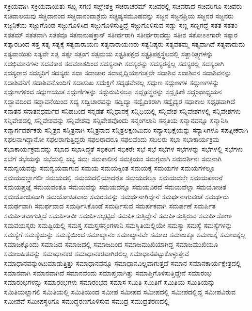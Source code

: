 {ಸಕ್ರಿಯವಾಗಿ
ಸಕ್ರಿಯವಾಯಿತು
ಸಖ್ಯ
ಸಗಣಿ
ಸಙ್ಘೇಶಕ್ತಿ
ಸಚರಾಚರಮ್
ಸಚಿವರಲ್ಲಿ
ಸಚಿವರಾದ
ಸಚಿವರಿಗೂ
ಸಚಿವರು
ಸಚಿವಾಲಯವು
ಸಚ್ಚಿದಾನಂದ
ಸಚ್ಚಿದಾನಂದಾಶ್ರಮ
ಸಚ್ಛಿಷ್ಯಸಮೂಹವನ್ನು
ಸಜ್ಜನ
ಸಜ್ಜನಪ್ರಿಯ
ಸಜ್ಜನರ
ಸಜ್ಜನರು
ಸಜ್ಜನಿಕೆಯ
ಸಜ್ಜುಗೊಂಡ
ಸಜ್ಜುಗೊಳಿಸಿದ
ಸಜ್ಜುಗೊಳಿಸುತ್ತಿದ್ದೆ
ಸಜ್ಜುಗೊಳಿಸುವ
ಸಡ್ಡು
ಸಣ್ಣ
ಸಣ್ಣಗದ್ದೆ
ಸತತ
ಸತತಂ
ಸತತಮ್
ಸತತವಾಗಿ
ಸತತವೂ
ಸತನಾನುಷಕ್ತಾನ್
ಸತೀರ್ಥರಾಗಿ
ಸತೀರ್ಥರಾದದ್ದು
ಸತೀಶ
ಸತೋಽಽಗಾರೇ
ಸತ್ಕಾರ
ಸತ್ಕಾರದಿಂದ
ಸತ್ತ
ಸತ್ಯ
ಸತ್ಯಕ್ಕೆ
ಸತ್ಯನಾರಾಯಣ
ಸತ್ಯನಾರಾಯಣರು
ಸತ್ಯನಿಷ್ಠರು
ಸತ್ಯವತಮ್ಮ
ಸತ್ಯವಾಗಿದೆ
ಸತ್ಯವಾದುದು
ಸತ್ಯವಾಯಿತು
ಸತ್ಯವೇ
ಸತ್ವ
ಸತ್ವೇ
ಸತ್ಸಂಗ
ಸತ್ಸಮಯ
ಸತ್ಪ್ರತಿಪಕ್ಷದ
ಸತ್ಪ್ರತಿಪಕ್ಷಸ್ಥಲದಲ್ಲಿ
ಸತ್ಚಾರಿತ್ರ್ಯಗಳನ್ನು
ಸದಭಿಮಾನಗಳು
ಸದವಕಾಶ
ಸದವಕಾಶದಿಂದ
ಸದಸ್ಯನಾಗಿ
ಸದಸ್ಯರನ್ನು
ಸದಸ್ಯರನ್ನೆಲ್ಲ
ಸದಸ್ಯರಲ್ಲಿ
ಸದಸ್ಯರಾಗಿ
ಸದಸ್ಯರಾದ
ಸದಸ್ಯರಿಗೆ
ಸದಸ್ಯರು
ಸದಾ
ಸದಾಚಾರ
ಸದಾವೃದ್ದಿಯಾಗುತ್ತಲೇ
ಸದಾಶಿವ
ಸದಾಶಿವನ
ಸದಾಶಿವನನ್ನು
ಸದಾಶಿವನಿಗೆ
ಸದಾಶಿವನೊಂದಿಗೆ
ಸದಾಸುಖ
ಸದುಕ್ತಿಗೆ
ಸದೃಢವೇನಲ್ಲ
ಸದ್ಗುಣ
ಸದ್ಗುಣಗಳ
ಸದ್ಗುಣಗಳನ್ನು
ಸದ್ಗುಣಗಳಿಂದ
ಸದ್ಗುಣಯುತ
ಸದ್ಗುಣಿಗಳನ್ನು
ಸದ್ಗುರುವಿನಲ್ಲೂ
ಸದ್ಗೃಹಸ್ಥರನ್ನು
ಸದ್ಗೃಹಿಣಿ
ಸದ್ಗ್ರಂಥಾಧ್ಯಯನ
ಸದ್ಭಾವದಿಂದ
ಸದ್ಭಾವನೆಯಿಂದ
ಸದ್ಯ
ಸದ್ವಿಚಾರವನ್ನು
ಸದ್ವಿದ್ಯಾ
ಸದ್ವೈದಿಕರಾಗಿ
ಸದ್ವೈದ್ಯರ
ಸಧಾಕಾಲ
ಸಧೃಢವಾಗಿದೆ
ಸನಾತನ
ಸನಾತನಧರ್ಮದ
ಸನಿಹದಿಂದ
ಸನ್ನಡತೆ
ಸನ್ನಿಧಾನಕ್ಕೆ
ಸನ್ನಿಧಿಯಲ್ಲಿ
ಸನ್ನಿವೇಶ
ಸನ್ನಿವೇಶಗಳಲ್ಲಿ
ಸನ್ನಿವೇಶಗಳು
ಸನ್ನಿವೇಶದಲ್ಲಿ
ಸನ್ನಿವೇಶವನ್ನು
ಸನ್ನಿವೇಶವು
ಸನ್ನಿವೇಶವೊಂದು
ಸನ್ಮಂಗಲಾನಿ
ಸನ್ಮತಿಯ
ಸನ್ಮಾನವನ್ನೂ
ಸನ್ಮಾನಿಸಿ
ಸನ್ಮಾರ್ಗದರ್ಶಕರು
ಸನ್ಮಿತ್ರನ
ಸನ್ಮಿತ್ರನಾಗಿ
ಸನ್ಮಿತ್ರನಾದ
ಸನ್ಮಿತ್ರಲಕ್ಷಣಮಿದಂ
ಸನ್ಯಾಸಭಿಕ್ಷೆಯನ್ನು
ಸನ್ಯಾಸಿಗಳೂ
ಸಪತ್ನೀಕರಾಗಿ
ಸಫಲನಾಗಿದ್ದಾನೋ
ಸಫಲರಾಗುತ್ತಿದ್ದರು
ಸಫಲರಾದರೂ
ಸಫಲವೆಂದು
ಸಬಲರು
ಸಭಾ
ಸಭಾಕಾರ್ಯಕ್ರಮ
ಸಭಾಕಾರ್ಯಕ್ರಮವನ್ನು
ಸಭಾದ
ಸಭಾಸಿದ್ಧತೆ
ಸಭಿಕರಿಗೆ
ಸಭಿಕರೇ
ಸಭೆ
ಸಭೆ
ಸಭೆಗಳ
ಸಭೆಗಳನ್ನು
ಸಭೆಗಳಲ್ಲಿ
ಸಭೆಗಳು
ಸಭೆಗೆ
ಸಭೆಯನ್ನು
ಸಭೆಯಲ್ಲಿ
ಸಭ್ಯ
ಸಮಃ
ಸಮಕಾಲೀನ
ಸಮಕ್ರಿಯಂ
ಸಮಗ್ರವಾಗಿ
ಸಮದರ್ಶಿನಃ
ಸಮನಾಗಿ
ಸಮನ್ವಯವನ್ನು
ಸಮನ್ವಯವಾಗುವ
ಸಮಯ
ಸಮಯಕ್ಕಿಂತ
ಸಮಯಕ್ಕೆ
ಸಮಯಗಳ
ಸಮಯಗಳಲ್ಲೂ
ಸಮಯದಲ್ಲಾಗಲೀ
ಸಮಯದಲ್ಲಿ
ಸಮಯದಲ್ಲಿಯಾದರೂ
ಸಮಯದಲ್ಲೂ
ಸಮಯದಲ್ಲೇ
ಸಮಯಪಾಲನೆ
ಸಮಯಪ್ರಜ್ಞೆ
ಸಮಯವಂತೂ
ಸಮಯವನ್ನು
ಸಮಯವನ್ನೂ
ಸಮಯವಿರದೆ
ಸಮಯವೆಲ್ಲಾ
ಸಮಯೋಚಿತ
ಸಮಯೋಚಿತವಾಗಿ
ಸಮಯೋಚಿತವಾದ
ಸಮರಸವನ್ನು
ಸಮರ್ಥನಾಗಿದ್ದೇನೆ
ಸಮರ್ಥನಾಗುವಂತೆ
ಸಮರ್ಥರು
ಸಮರ್ಥವಾಗಿ
ಸಮರ್ಥವಾದ
ಸಮರ್ಥಿಸಿಕೊಂಡೆ
ಸಮರ್ಥಿಸುವ
ಸಮರ್ಪಕವಾಗಿ
ಸಮರ್ಪಣೆ
ಸಮರ್ಪಿತ
ಸಮರ್ಪಿತವಾಗುತ್ತಿದೆ
ಸಮರ್ಪಿತವೀ
ಸಮರ್ಪಿಸಲ್ಪಟ್ಟಿದೆ
ಸಮರ್ಪಿಸುತ್ತಿದ್ದೇನೆ
ಸಮರ್ಪಿಸುತ್ತಿರುವ
ಸಮರ್ಪಿಸೋಣ
ಸಮವಯಸ್ಕರು
ಸಮಷ್ಟಿಯಲ್ಲಿ
ಸಮಸ್ತ
ಸಮಸ್ತಸನ್ಮಂಗಳಾನಿ
ಸಮಸ್ಥಿತಿಯಲ್ಲಿಯೇ
ಸಮಸ್ಯಾ
ಸಮಸ್ಯೆ
ಸಮಸ್ಯೆಗಳನ್ನು
ಸಮಸ್ಯೆಗೆ
ಸಮಸ್ಯೆಯನ್ನು
ಸಮಸ್ಯೆಯಿಂದ
ಸಮಾಖ್ಯಾನಂ
ಸಮಾಖ್ಯಾನವೇ
ಸಮಾಜ
ಸಮಾಜಕ್ಕೂ
ಸಮಾಜಕ್ಕೆ
ಸಮಾಜಕ್ಕೆಲ್ಲ
ಸಮಾಜಕ್ಕೊಂದು
ಸಮಾಜದ
ಸಮಾಜದಲ್ಲಿ
ಸಮಾಜದಿಂದ
ಸಮಾಜಮುಖಿಯಾಗಿದ್ದ
ಸಮಾಜಮುಖಿಯೂ
ಸಮಾಜಹಿತವನ್ನು
ಸಮಾಧಾನಕರ
ಸಮಾಧಾನಕರವಾಗಿರಲಿಲ್ಲ
ಸಮಾಧಾನಪಟ್ಟುಕೊಳ್ಳುತ್ತೇವೆ
ಸಮಾಧಾನವನ್ನುಂಟುಮಾಡುತ್ತಿತ್ತು
ಸಮಾಧಾನವನ್ನೂ
ಸಮಾಧಾನವಿಲ್ಲವಾಗುತ್ತದೆ
ಸಮಾನ
ಸಮಾನಕಾರ್ಯಕ್ಷೇತ್ರದಲ್ಲಿ
ಸಮಾನವಾಗಿ
ಸಮಾನವಾಗಿದೆ
ಸಮಾನವೆಂದು
ಸಮಾಪ್ತವಾಗಿತ್ತು
ಸಮಾಪ್ತಿಗೊಳಿಸುತ್ತಿದ್ದೇನೆ
ಸಮಾರಂಭ
ಸಮಾರಂಭಗಳನ್ನು
ಸಮಾರಂಭಗಳು
ಸಮಾರಂಭದ
ಸಮಾಸ
ಸಮಿತಿ
ಸಮಿತಿಗೆ
ಸಮಿತಿಯ
ಸಮಿತಿಯನ್ನು
ಸಮಿತಿಯಲ್ಲಾಗಲಿ
ಸಮಿತಿಯಲ್ಲಿ
ಸಮಿತಿಯಿಂದ
ಸಮೀಪ
ಸಮೀಪದ
ಸಮೀಪದಲ್ಲಿ
ಸಮೀಪದಲ್ಲಿದ್ದ
ಸಮೀಪವಿರುವ
ಸಮೀಪವೆ
ಸಮೀಪಸ್ಥರಿಗೂ
ಸಮುದ್ಧರಣಗೊಳಿಸುವ
ಸಮುದ್ರ
ಸಮುದ್ರತರಣದಲ್ಲಿ
}
